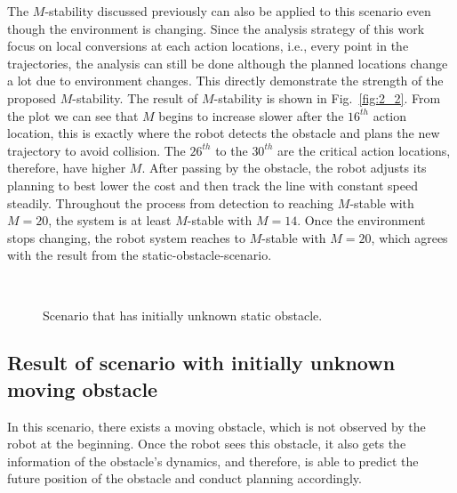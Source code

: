 \documentclass[letterpaper, 10 pt, conference]{ieeeconf}  %
\begin{document}
The $M$-stability discussed previously can also be applied to this scenario even though the environment is changing. Since the analysis strategy of this work focus on local conversions at each action locations, i.e., every point in the trajectories, the analysis can still be done although the planned locations change a lot due to environment changes. This directly demonstrate the strength of the proposed $M$-stability. The result of $M$-stability is shown in Fig.~\ref{fig:2_2}. From the plot we can see that $M$ begins to increase slower after the $16^{th}$ action location, this is exactly where the robot detects the obstacle and plans the new trajectory to avoid collision. The $26^{th}$ to the $30^{th}$ are the critical action locations, therefore, have higher $M$. After passing by the obstacle, the robot adjusts its planning to best lower the cost and then track the line with constant speed steadily. Throughout the process from detection to reaching $M$-stable with $M=20$, the system is at least $M$-stable with $M=14$. Once the environment stops changing, the robot system reaches to $M$-stable with $M=20$, which agrees with the result from the static-obstacle-scenario.     




\begin{figure}[t]
      \centering
      \\
      
      \caption{Scenario that has initially unknown static obstacle.}
      
\end{figure}





\subsection{Result of scenario with initially unknown moving obstacle}
In this scenario, there exists a moving obstacle, which is not observed by the robot at the beginning. Once the robot sees this obstacle, it also gets the information of the obstacle's dynamics, and therefore, is able to predict the future position of the obstacle and conduct planning accordingly. 
\end{document}
